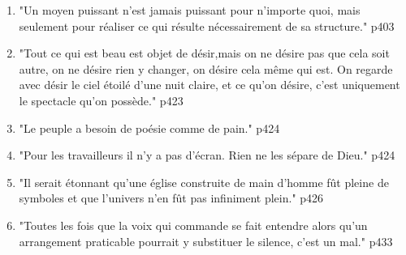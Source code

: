 \documentclass[a4paper,12pt]{book}
\begin{document}
{\begin{enumerate}
\item "Un moyen puissant n'est jamais puissant pour n'importe quoi, mais seulement pour réaliser ce qui résulte nécessairement de sa structure." p403
\item "Tout ce qui est beau est objet de désir,mais on ne désire pas que cela soit autre, on ne désire rien y changer, on désire cela même qui est. On regarde avec désir le ciel étoilé d'une nuit claire, et ce qu'on désire, c'est uniquement le spectacle qu'on possède." p423
\item "Le peuple a besoin de poésie comme de pain." p424
\item "Pour les travailleurs il n'y a pas d'écran. Rien ne les sépare de Dieu." p424
\item "Il serait étonnant qu'une église construite de main d'homme fût pleine de symboles et que l'univers n'en fût pas infiniment plein." p426
\item "Toutes les fois que la voix qui commande se fait entendre alors qu'un arrangement praticable pourrait y substituer le silence, c'est un mal." p433
\end{enumerate}
}
\end{document}
